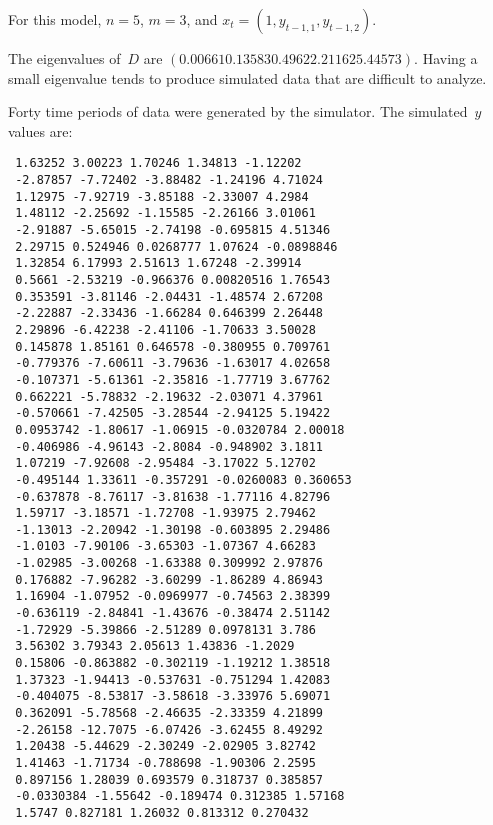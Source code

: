 \bigskip
For this model, $n=5$, $m=3$, and $x_t=(1,y_{t-1,1},y_{t-1,2})$.

The eigenvalues of~$D$ are $(0.00661 0.13583 0.4962 2.21162 5.44573)$.
Having a small eigenvalue tends to produce simulated data that are
difficult to analyze.

Forty time periods of data were generated by the simulator.
The simulated~$y$ values are:
\begin{lstlisting}
 1.63252 3.00223 1.70246 1.34813 -1.12202
 -2.87857 -7.72402 -3.88482 -1.24196 4.71024
 1.12975 -7.92719 -3.85188 -2.33007 4.2984
 1.48112 -2.25692 -1.15585 -2.26166 3.01061
 -2.91887 -5.65015 -2.74198 -0.695815 4.51346
 2.29715 0.524946 0.0268777 1.07624 -0.0898846
 1.32854 6.17993 2.51613 1.67248 -2.39914
 0.5661 -2.53219 -0.966376 0.00820516 1.76543
 0.353591 -3.81146 -2.04431 -1.48574 2.67208
 -2.22887 -2.33436 -1.66284 0.646399 2.26448
 2.29896 -6.42238 -2.41106 -1.70633 3.50028
 0.145878 1.85161 0.646578 -0.380955 0.709761
 -0.779376 -7.60611 -3.79636 -1.63017 4.02658
 -0.107371 -5.61361 -2.35816 -1.77719 3.67762
 0.662221 -5.78832 -2.19632 -2.03071 4.37961
 -0.570661 -7.42505 -3.28544 -2.94125 5.19422
 0.0953742 -1.80617 -1.06915 -0.0320784 2.00018
 -0.406986 -4.96143 -2.8084 -0.948902 3.1811
 1.07219 -7.92608 -2.95484 -3.17022 5.12702
 -0.495144 1.33611 -0.357291 -0.0260083 0.360653
 -0.637878 -8.76117 -3.81638 -1.77116 4.82796
 1.59717 -3.18571 -1.72708 -1.93975 2.79462
 -1.13013 -2.20942 -1.30198 -0.603895 2.29486
 -1.0103 -7.90106 -3.65303 -1.07367 4.66283
 -1.02985 -3.00268 -1.63388 0.309992 2.97876
 0.176882 -7.96282 -3.60299 -1.86289 4.86943
 1.16904 -1.07952 -0.0969977 -0.74563 2.38399
 -0.636119 -2.84841 -1.43676 -0.38474 2.51142
 -1.72929 -5.39866 -2.51289 0.0978131 3.786
 3.56302 3.79343 2.05613 1.43836 -1.2029
 0.15806 -0.863882 -0.302119 -1.19212 1.38518
 1.37323 -1.94413 -0.537631 -0.751294 1.42083
 -0.404075 -8.53817 -3.58618 -3.33976 5.69071
 0.362091 -5.78568 -2.46635 -2.33359 4.21899
 -2.26158 -12.7075 -6.07426 -3.62455 8.49292
 1.20438 -5.44629 -2.30249 -2.02905 3.82742
 1.41463 -1.71734 -0.788698 -1.90306 2.2595
 0.897156 1.28039 0.693579 0.318737 0.385857
 -0.0330384 -1.55642 -0.189474 0.312385 1.57168
 1.5747 0.827181 1.26032 0.813312 0.270432
\end{lstlisting}

